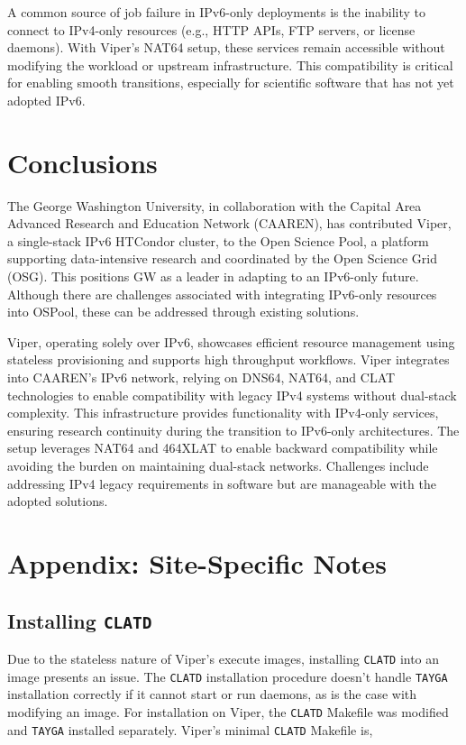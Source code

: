 \documentclass[11pt]{article}
\begin{document}
A common source of job failure in IPv6-only deployments is the inability to connect to IPv4-only resources (e.g., HTTP APIs, FTP servers, or license daemons). With Viper’s NAT64 setup, these services remain accessible without modifying the workload or upstream infrastructure. This compatibility is critical for enabling smooth transitions, especially for scientific software that has not yet adopted IPv6.



\section{Conclusions}
The George Washington University, in collaboration with the Capital Area Advanced Research and Education Network (CAAREN), has contributed Viper, a single-stack IPv6 HTCondor cluster, to the Open Science Pool, a platform supporting data-intensive research and coordinated by the Open Science Grid (OSG). This positions GW as a leader in adapting to an IPv6-only future. Although there are challenges associated with integrating IPv6-only resources into OSPool, these can be addressed through existing solutions.

Viper, operating solely over IPv6, showcases efficient resource management using stateless provisioning and supports high throughput workflows. Viper integrates into CAAREN's IPv6 network, relying on DNS64, NAT64, and CLAT technologies to enable compatibility with legacy IPv4 systems without dual-stack complexity. This infrastructure provides functionality with IPv4-only services, ensuring research continuity during the transition to IPv6-only architectures. The setup leverages NAT64 and 464XLAT to enable backward compatibility while avoiding the burden on maintaining dual-stack networks. Challenges include addressing IPv4 legacy requirements in software but are manageable with the adopted solutions.


\section{Appendix: Site-Specific Notes}
\subsection{Installing \texttt{CLATD}}
Due to the stateless nature of Viper's execute images, installing \texttt{CLATD} into an image presents an issue. The \texttt{CLATD} installation procedure doesn't handle \texttt{TAYGA} installation correctly if it cannot start or run daemons, as is the case with modifying an image.  For installation on Viper,  the \texttt{CLATD} Makefile was modified and \texttt{TAYGA} installed separately.  Viper's minimal \texttt{CLATD} Makefile is,
\end{document}

